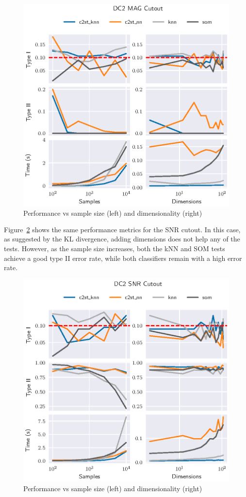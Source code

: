 \begin{figure}[htpb]
    \centering
    \includegraphics{images/4_som/dc2_mag}
    \caption{Performance vs sample size (left) and dimensionality (right)}
    \label{fig:dc2_mag}
\end{figure}

Figure~\ref{fig:dc2_snr} shows the same performance metrics for the SNR cutout. In this case,
as suggested by the KL divergence, adding dimensions does not help any of the tests.
However, as the sample size increases, both the kNN and SOM tests achieve a good type II error rate,
while both classifiers remain with a high error rate.

\begin{figure}[htbp]
    \centering
    \includegraphics{images/4_som/dc2_snr}
    \caption{Performance vs sample size (left) and dimensionality (right)}
    \label{fig:dc2_snr}
\end{figure}

